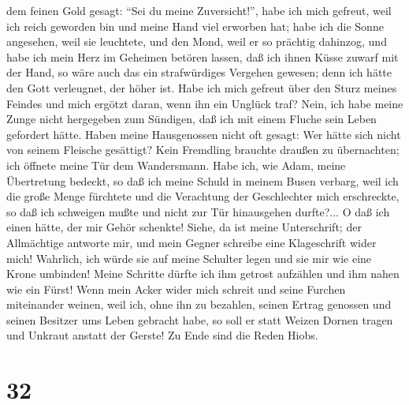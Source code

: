 dem feinen Gold gesagt:  ``Sei du meine Zuversicht!'',
habe ich mich gefreut, weil ich reich geworden bin und meine Hand viel
erworben hat;  habe ich die Sonne angesehen, weil sie
leuchtete, und den Mond, weil er so prächtig dahinzog, 
und habe ich mein Herz im Geheimen betören lassen, daß ich ihnen Küsse
zuwarf mit der Hand,  so wäre auch das ein strafwürdiges
Vergehen gewesen; denn ich hätte den Gott verleugnet, der höher ist.
 Habe ich mich gefreut über den Sturz meines Feindes und
mich ergötzt daran, wenn ihn ein Unglück traf?  Nein, ich
habe meine Zunge nicht hergegeben zum Sündigen, daß ich mit einem Fluche
sein Leben gefordert hätte.  Haben meine Hausgenossen
nicht oft gesagt: Wer hätte sich nicht von seinem Fleische gesättigt?
 Kein Fremdling brauchte draußen zu übernachten; ich
öffnete meine Tür dem Wandersmann.  Habe ich, wie Adam,
meine Übertretung bedeckt, so daß ich meine Schuld in meinem Busen
verbarg,  weil ich die große Menge fürchtete und die
Verachtung der Geschlechter mich erschreckte, so daß ich schweigen mußte
und nicht zur Tür hinausgehen durfte?...  O daß ich einen
hätte, der mir Gehör schenkte! Siehe, da ist meine Unterschrift; der
Allmächtige antworte mir, und mein Gegner schreibe eine Klageschrift
wider mich!  Wahrlich, ich würde sie auf meine Schulter
legen und sie mir wie eine Krone umbinden!  Meine
Schritte dürfte ich ihm getrost aufzählen und ihm nahen wie ein Fürst!
 Wenn mein Acker wider mich schreit und seine Furchen
miteinander weinen,  weil ich, ohne ihn zu bezahlen,
seinen Ertrag genossen und seinen Besitzer ums Leben gebracht habe,
 so soll er statt Weizen Dornen tragen und Unkraut
anstatt der Gerste! Zu Ende sind die Reden Hiobs.

\hypertarget{section-31}{%
\section{32}\label{section-31}}

